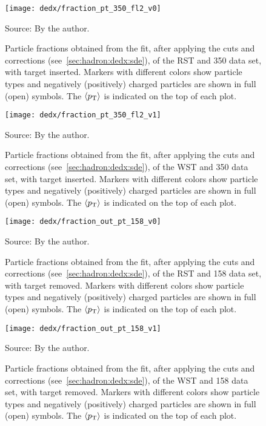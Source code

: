 \begin{figure}
  \centering
  \texttt{[image: dedx/fraction\_pt\_350\_fl2\_v0]}
  \caption{Particle fractions obtained from the \dedx fit,
    after applying the cuts and corrections (see~\cref{sec:hadron:dedx:sde}),
    of the RST and 350 \GeVc data set, with target inserted. Markers with different
    colors show particle types and negatively (positively) charged particles are shown
    in full (open) symbols. The $\langle p_\text{T}\rangle$ is indicated on the top of each plot.}
  \label{fig:hadron:dedx:fit:final350r}
  \begin{center}
    \small Source: By the author. 
  \end{center}
\end{figure}

\begin{figure}
  \centering
  \texttt{[image: dedx/fraction\_pt\_350\_fl2\_v1]}
  \caption{Particle fractions obtained from the \dedx fit,
    after applying the cuts and corrections (see~\cref{sec:hadron:dedx:sde}),
    of the WST and 350 \GeVc data set, with target inserted. Markers with different
    colors show particle types and negatively (positively) charged particles are shown
    in full (open) symbols. The $\langle p_\text{T}\rangle$ is indicated on the top of each plot.}
  \label{fig:hadron:dedx:fit:final350w}
  \begin{center}
    \small Source: By the author. 
  \end{center}
\end{figure}

\begin{figure}
  \centering
  \texttt{[image: dedx/fraction\_out\_pt\_158\_v0]}
  \caption{Particle fractions obtained from the \dedx fit,
    after applying the cuts and corrections (see~\cref{sec:hadron:dedx:sde}),
    of the RST and 158 \GeVc data set, with target removed. Markers with different
    colors show particle types and negatively (positively) charged particles are shown
    in full (open) symbols. The $\langle p_\text{T}\rangle$ is indicated on the top of each plot.}
  \label{fig:hadron:dedx:fit:out158r}
  \begin{center}
    \small Source: By the author. 
  \end{center}
\end{figure}

\begin{figure}
  \centering
  \texttt{[image: dedx/fraction\_out\_pt\_158\_v1]}
  \caption{Particle fractions obtained from the \dedx fit,
    after applying the cuts and corrections (see~\cref{sec:hadron:dedx:sde}),
    of the WST and 158 \GeVc data set, with target removed. Markers with different
    colors show particle types and negatively (positively) charged particles are shown
    in full (open) symbols. The $\langle p_\text{T}\rangle$ is indicated on the top of each plot.}
  \label{fig:hadron:dedx:fit:out158w}
  \begin{center}
    \small Source: By the author. 
  \end{center}
\end{figure}

